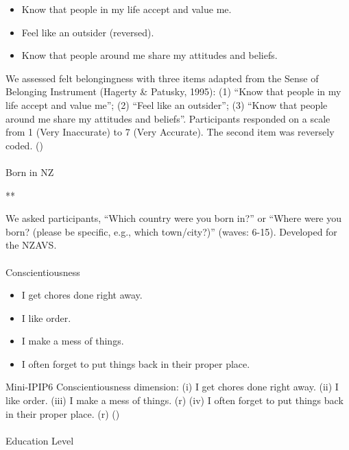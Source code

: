 \documentclass[
  single column]{article}
\makeatletter
\let\oldparagraph\paragraph
\renewcommand{\paragraph}{
    \@ifstar
      \xxxParagraphStar
      \xxxParagraphNoStar
  }
\newcommand{\xxxParagraphStar}[1]{\oldparagraph*{#1}\mbox{}}
\newcommand{\xxxParagraphNoStar}[1]{\oldparagraph{#1}\mbox{}}
\providecommand{\tightlist}{%
  \setlength{\itemsep}{0pt}\setlength{\parskip}{0pt}}\usepackage{longtable,booktabs,array}
\makeatother
\begin{document}
\begin{itemize}
\tightlist
\item
  Know that people in my life accept and value me.
\item
  Feel like an outsider (reversed).
\item
  Know that people around me share my attitudes and beliefs.
\end{itemize}

We assessed felt belongingness with three items adapted from the Sense
of Belonging Instrument (Hagerty \& Patusky, 1995): (1) ``Know that
people in my life accept and value me''; (2) ``Feel like an outsider'';
(3) ``Know that people around me share my attitudes and beliefs''.
Participants responded on a scale from 1 (Very Inaccurate) to 7 (Very
Accurate). The second item was reversely coded.
()

\paragraph{Born in NZ}\label{born-in-nz}

**

We asked participants, ``Which country were you born in?'' or ``Where
were you born? (please be specific, e.g., which town/city?)'' (waves:
6-15). Developed for the NZAVS.

\paragraph{Conscientiousness}\label{conscientiousness}

\begin{itemize}
\tightlist
\item
  I get chores done right away.
\item
  I like order.
\item
  I make a mess of things.
\item
  I often forget to put things back in their proper place.
\end{itemize}

Mini-IPIP6 Conscientiousness dimension: (i) I get chores done right
away. (ii) I like order. (iii) I make a mess of things. (r) (iv) I often
forget to put things back in their proper place. (r)
()

\paragraph{Education Level}\label{education-level}
\end{document}
